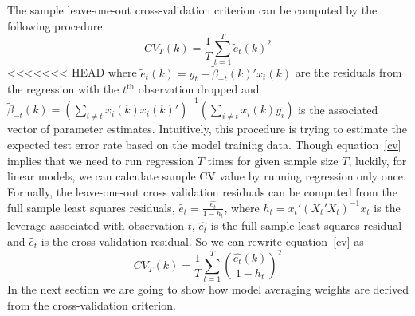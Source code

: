 The sample leave-one-out cross-validation criterion can be computed by the following procedure:
\begin{equation} \label{cv}
	CV_T(k) = \frac{1}{T}\sum_{t=1}^{T}\tilde{e}_{t}(k)^{2}
\end{equation}
<<<<<<< HEAD
where $\tilde{e}_{t}(k) = y_t - \tilde{\beta}_{-t}(k)'x_t(k)$ are the residuals from the regression with the $t^{\mathrm{th}}$ observation dropped and $\tilde{\beta}_{-t}(k) = (\sum_{i\not= t}x_i(k) x_i(k)')^{-1}(\sum_{i\not= t}x_i(k) y_i)$ is the associated vector of parameter estimates. Intuitively, this procedure is trying to estimate the expected test error rate based on the model training data. Though equation~\ref{cv} implies that we need to run regression $T$ times for given sample size $T$, luckily, for linear models, we can calculate sample CV value by running regression only once. Formally, the leave-one-out cross validation residuals can be computed from the full sample least squares residuals, $\tilde{e_{t}} = \frac{\hat{e_{t}}}{1 - h_{t}}$, where $h_{t} = x_{t}'(X_{t}'X_{t})^{-1}x_{t}$ is the leverage associated with observation $t$, $\hat{e_{t}}$ is the full sample least squares residual and $\tilde{e_{t}}$ is the cross-validation residual. So we can rewrite equation~\ref{cv} as
\begin{equation}
    CV_T(k) = \frac{1}{T}\sum_{t=1}^{T}\left( \frac{\hat{e_{t}}(k)}{1 - h_{t}} \right)^{2}
\end{equation}
In the next section we are going to show how model averaging weights are derived from the cross-validation criterion.
